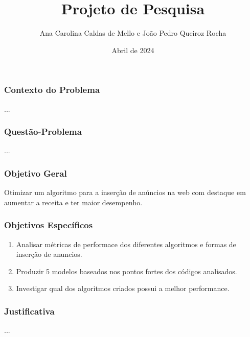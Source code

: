 \documentclass{beamer}
\title{Projeto de Pesquisa}
\author{Ana Carolina Caldas de Mello e João Pedro Queiroz Rocha}
\date{Abril de 2024}
\begin{document}
\maketitle

\begin{frame}
    \frametitle{Contexto do Problema}
    ...
\end{frame}

\begin{frame}
    \frametitle{Questão-Problema}
    ...
\end{frame}

\begin{frame}
    \frametitle{Objetivo Geral}
    Otimizar um algoritmo para a inserção de anúncios na web com destaque em aumentar a receita e ter maior desempenho.
\end{frame}

\begin{frame}
    \frametitle{Objetivos Específicos}
    \begin{enumerate}
       \item Analisar métricas de performace dos diferentes algoritmos e formas de inserção de anuncios.
       \item Produzir 5 modelos baseados nos pontos fortes dos códigos analisados.
       \item Investigar qual dos algoritmos criados possui a melhor performance.
     \end{enumerate}
\end{frame}

\begin{frame}
    \frametitle{Justificativa}
    ...
\end{frame}
\end{document}
